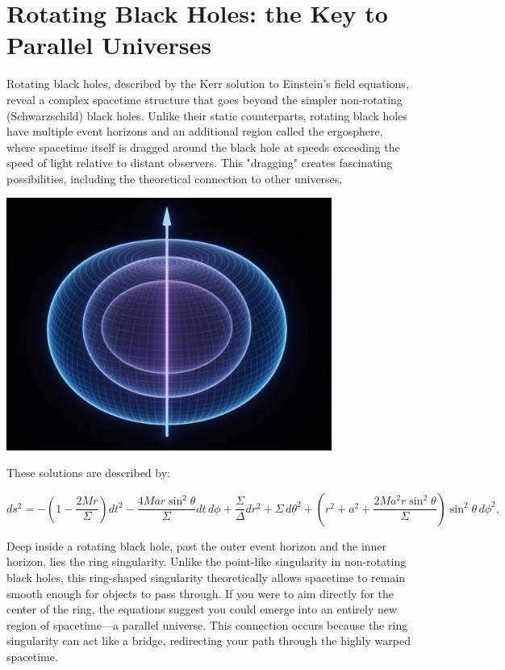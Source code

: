 \documentclass[12pt,a4paper]{article}
\begin{document}
\section{Rotating Black Holes: the Key to Parallel Universes}
Rotating black holes, described by the Kerr solution to Einstein’s field equations, reveal a complex spacetime structure that goes beyond the simpler non-rotating (Schwarzschild) black holes. Unlike their static counterparts, rotating black holes have multiple event horizons and an additional region called the ergosphere, where spacetime itself is dragged around the black hole at speeds exceeding the speed of light relative to distant observers. This "dragging" creates fascinating possibilities, including the theoretical connection to other universes.
\begin{center}
    \includegraphics[width=0.8\textwidth]{rotating_black_holes.png}    
\end{center}

These solutions are described by:

\[
ds^2 = -\left(1 - \frac{2Mr}{\Sigma}\right) dt^2 
       - \frac{4Mar\sin^2\theta}{\Sigma} dt \, d\phi 
       + \frac{\Sigma}{\Delta} dr^2 
       + \Sigma \, d\theta^2 
       + \left(r^2 + a^2 + \frac{2Ma^2r\sin^2\theta}{\Sigma}\right) \sin^2\theta \, d\phi^2,
\]

Deep inside a rotating black hole, past the outer event horizon and the inner horizon, lies the ring singularity. Unlike the point-like singularity in non-rotating black holes, this ring-shaped singularity theoretically allows spacetime to remain smooth enough for objects to pass through. If you were to aim directly for the center of the ring, the equations suggest you could emerge into an entirely new region of spacetime—a parallel universe. This connection occurs because the ring singularity can act like a bridge, redirecting your path through the highly warped spacetime.
\end{document}
